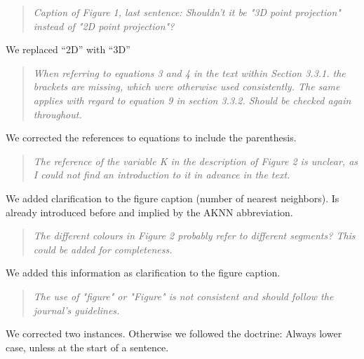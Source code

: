 \documentclass{article}
\newenvironment{itquote}
  {\begin{quote}\itshape}
  {\end{quote}\ignorespacesafterend}
\begin{document}
\begin{itquote}
  Caption of Figure 1, last sentence: Shouldn't it be "3D point projection" instead of "2D point projection"?
\end{itquote}

We replaced ``2D'' with ``3D''

\begin{itquote}
  When referring to equations 3 and 4 in the text within Section 3.3.1. the brackets are missing, which were otherwise used consistently. The same applies with regard to equation 9 in section 3.3.2. Should be checked again throughout.
\end{itquote}

We corrected the references to equations to include the parenthesis. 

\begin{itquote}
  The reference of the variable K in the description of Figure 2 is unclear, as I could not find an introduction to it in advance in the text.
\end{itquote}

We added clarification to the figure caption (number of nearest neighbors). 
Is already introduced before and implied by the AKNN abbreviation. 

\begin{itquote}
 The different colours in Figure 2 probably refer to different segments? This could be added for completeness.
\end{itquote}

We added this information as clarification to the figure caption.

\begin{itquote}
  The use of "figure" or "Figure" is not consistent and should follow the journal's guidelines.
\end{itquote}

We corrected two instances. 
Otherwise we followed the doctrine: Always lower case, unless at the start of a sentence. 
\end{document}
